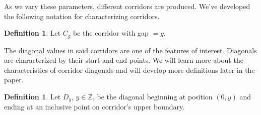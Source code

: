 \documentclass{article}
\newcommand*{\set}[1]{\mathbb{#1}}
\theoremstyle{definition}
\newtheorem{defn}[thm]{Definition}
\begin{document}
  \noindent As we vary these parameters, different corridors are produced. We've developed the following notation for characterizing 
  corridors.
  \begin{defn} Let $C_g$ be the corridor with gap $=g$. \\ \end{defn}
  
  \noindent The diagonal values in said corridors are one of the features of interest. Diagonals are characterized by their start and end points.
  We will learn more about the characteristics of corridor diagonals and will develop more definitions later in the paper. 
  \begin{defn} Let $D_y$, $y \in \set{Z}$, be the diagonal beginning at position $(0, y)$ and ending at an inclusive point on corridor's upper boundary. \\ \end{defn}

  
  
\end{document}
